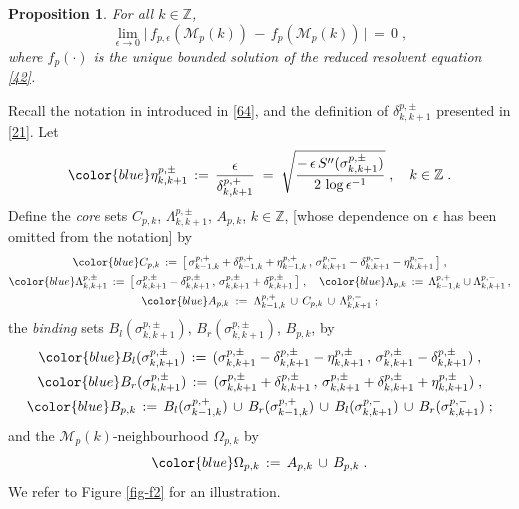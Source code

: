 \documentclass[reqno]{amsart}
\theoremstyle{plain}
\newtheorem{proposition}[theorem]{Proposition}
\theoremstyle{definition}
\newcommand{\bb}[1]{{\mathbb #1}}
\newcommand{\ms}[1]{{\mathscr #1}}
\newcounter{as}[section]
\newcommand{\<}{\langle}
\renewcommand{\>}{\rangle}
\begin{document}
\begin{proposition}
\label{l24}
For all $k\in \bb Z$, 
\begin{equation*}
\lim_{\epsilon \to 0} \big|\, f_{p,\epsilon} (\ms M_p(k))
\,-\, f_p(\ms M_{p}(k))\,\big| \,=\,  0\;,
\end{equation*}
where $f_p(\cdot)$ is the unique bounded solution of the 
reduced resolvent equation \eqref{42}.
\end{proposition}


Recall the notation in introduced in \eqref{64}, and the definition of
$\delta^{p,\pm}_{k,k+1}$ presented in \eqref{21}. Let
\begin{equation*}
{\color{blue} \eta^{p,\pm}_{k,k+1}}
\,:=\, \frac{\epsilon}{\delta^{p,+}_{k,k+1}}
\;=\;
\sqrt{\frac{-\, \epsilon \, S''(\sigma^{p,\pm}_{k,k+1})}
{2  \,  \log \epsilon^{-1}}}\;,
\quad k\in \bb Z\;.
\end{equation*}
Define the \emph{core} sets $C_{p,k}$, $\Lambda^{p,\pm}_{k,k+1}$,
$A_{p,k}$, $k\in\bb Z$, [whose dependence on $\epsilon$ has been
omitted from the notation] by
\begin{gather*} 
{\color{blue} C_{p,k}}
\,:=\, \big[\, \sigma^{p,+}_{k-1,k} + \delta^{p,+}_{k-1,k} + \eta^{p,+}_{k-1,k}  \,,\,
\sigma^{p,-}_{k,k+1} -  \delta^{p,-}_{k,k+1} - \eta^{p,-}_{k,k+1} \,\big] \;,
\\
{\color{blue} \Lambda^{p,\pm}_{k,k+1}}
\,:=\, \big[\,  \sigma^{p,\pm}_{k,k+1}-
\delta^{p,\pm}_{k,k+1}  \,,\,
\sigma^{p,\pm}_{k,k+1}+
\delta^{p,\pm}_{k,k+1}  \,\big] \;,
\quad
{\color{blue} \Lambda_{p,k}}
\,:=\, \Lambda^{p,+}_{k-1,k} \cup \Lambda^{p,-}_{k,k+1} \,,
\\
{\color{blue}  A_{p,k} }  \; := \;
\Lambda^{p,+}_{k-1,k} \,\cup\, C_{p,k} \,\cup\,
\Lambda^{p,-}_{k,k+1}  \;;
\end{gather*}
the \emph{binding} sets $B_l(\sigma^{p,\pm}_{k,k+1})$,
$B_r(\sigma^{p,\pm}_{k,k+1})$, 
$B_{p,k}$, by
\begin{gather*}
{\color{blue} B_l(\sigma^{p,\pm}_{k,k+1})}  \,:=\,
(\sigma^{p,\pm}_{k,k+1} - \delta^{p,\pm}_{k,k+1} -
\eta^{p,\pm}_{k,k+1}  \,,\,
\sigma^{p,\pm}_{k,k+1} - \delta^{p,\pm}_{k,k+1})\;,
\\
{\color{blue} B_r(\sigma^{p,\pm}_{k,k+1})}  \,:=\,
(\sigma^{p,\pm}_{k,k+1} + \delta^{p,\pm}_{k,k+1} \,,\,
\sigma^{p,\pm}_{k,k+1} + \delta^{p,\pm}_{k,k+1} +
\eta^{p,\pm}_{k,k+1} )\;,
\\
{\color{blue} B_{p,k}} \,:=\,
B_l(\sigma^{p,+}_{k-1,k}) \,\cup\,
B_r(\sigma^{p,+}_{k-1,k} ) \,\cup\,
B_l(\sigma^{p,-}_{k,k+1}) \,\cup\,
B_r(\sigma^{p,-}_{k,k+1} ) \;;
\end{gather*}
and the $\ms M_{p}(k)$-neighbourhood $\Omega_{p,k}$ by
\begin{equation}
\label{kth_E_neigh}
{\color{blue}\Omega_{p,k}} \, :=\,
A_{p,k} \,\cup\, B_{p,k} \;.
\end{equation}
We refer to Figure \ref{fig-f2} for an illustration. 
\end{document}
